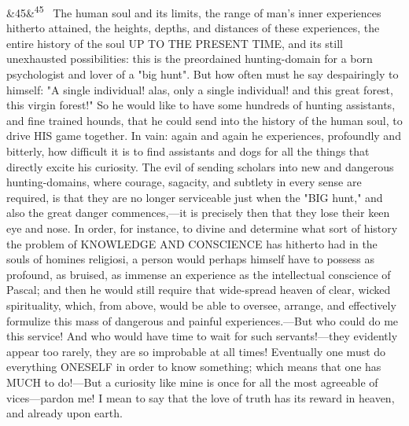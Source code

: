 \documentclass[12pt]{article}
\newcommand{\para}[1][]{\par\noindent\ifx&#1&\else\textsuperscript{\footnotesize #1}~\fi}
\begin{document}
\para[45] The human soul and its limits, the range of man's inner experiences hitherto attained, the heights, depths, and distances of these experiences, the entire history of the soul UP TO THE PRESENT TIME, and its still unexhausted possibilities: this is the preordained hunting-domain for a born psychologist and lover of a "big hunt". But how often must he say despairingly to himself: "A single individual! alas, only a single individual! and this great forest, this virgin forest!" So he would like to have some hundreds of hunting assistants, and fine trained hounds, that he could send into the history of the human soul, to drive HIS game together. In vain: again and again he experiences, profoundly and bitterly, how difficult it is to find assistants and dogs for all the things that directly excite his curiosity. The evil of sending scholars into new and dangerous hunting-domains, where courage, sagacity, and subtlety in every sense are required, is that they are no longer serviceable just when the "BIG hunt," and also the great danger commences,---it is precisely then that they lose their keen eye and nose. In order, for instance, to divine and determine what sort of history the problem of KNOWLEDGE AND CONSCIENCE has hitherto had in the souls of homines religiosi, a person would perhaps himself have to possess as profound, as bruised, as immense an experience as the intellectual conscience of Pascal; and then he would still require that wide-spread heaven of clear, wicked spirituality, which, from above, would be able to oversee, arrange, and effectively formulize this mass of dangerous and painful experiences.---But who could do me this service! And who would have time to wait for such servants!---they evidently appear too rarely, they are so improbable at all times! Eventually one must do everything ONESELF in order to know something; which means that one has MUCH to do!---But a curiosity like mine is once for all the most agreeable of vices---pardon me! I mean to say that the love of truth has its reward in heaven, and already upon earth.
\end{document}
